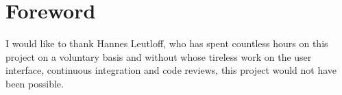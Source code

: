 \documentclass[a4paper,11pt]{article}
\begin{document}
    
    \maketitle

    \pagebreak

    

    \pagebreak
    
    \tableofcontents

    \pagebreak
    
    \section{Foreword}
        I would like to thank Hannes Leutloff, who has spent countless hours
        on this project on a voluntary basis and without whose tireless work on
        the user interface, continuous integration and code reviews, 
        this project would not have been possible.

    
    
    
    
    
    

    \pagebreak

    

    \pagebreak
    
    \listoffigures
    \listoftables
    
    
    
    
\end{document}
